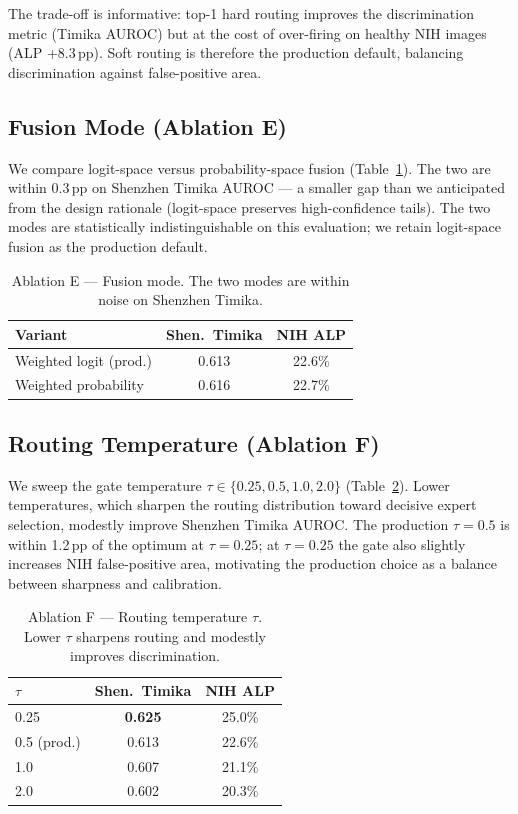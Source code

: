 \documentclass{article}
\begin{document}
The trade-off is informative: top-1 hard routing improves the discrimination metric (Timika AUROC) but at the cost of over-firing on healthy NIH images (ALP +8.3\,pp). Soft routing is therefore the production default, balancing discrimination against false-positive area.

\subsection{Fusion Mode (Ablation E)}
\label{sec:abl_E}

We compare logit-space versus probability-space fusion (Table~\ref{tab:abl_fusion}). The two are within 0.3\,pp on Shenzhen Timika AUROC --- a smaller gap than we anticipated from the design rationale (logit-space preserves high-confidence tails). The two modes are statistically indistinguishable on this evaluation; we retain logit-space fusion as the production default.

\begin{table}[t]
\caption{Ablation E --- Fusion mode. The two modes are within noise on Shenzhen Timika.}
\label{tab:abl_E}
\label{tab:abl_fusion}
\vskip 0.1in
\centering
\small
\begin{tabular}{lcc}
\toprule
Variant & Shen.\ Timika & NIH ALP \\
\midrule
Weighted logit (prod.) & 0.613 & 22.6\% \\
Weighted probability & 0.616 & 22.7\% \\
\bottomrule
\end{tabular}
\end{table}

\subsection{Routing Temperature (Ablation F)}
\label{sec:abl_F}

We sweep the gate temperature $\tau \in \{0.25, 0.5, 1.0, 2.0\}$ (Table~\ref{tab:abl_F}). Lower temperatures, which sharpen the routing distribution toward decisive expert selection, modestly improve Shenzhen Timika AUROC. The production $\tau = 0.5$ is within 1.2\,pp of the optimum at $\tau = 0.25$; at $\tau = 0.25$ the gate also slightly increases NIH false-positive area, motivating the production choice as a balance between sharpness and calibration.

\begin{table}[t]
\caption{Ablation F --- Routing temperature $\tau$. Lower $\tau$ sharpens routing and modestly improves discrimination.}
\label{tab:abl_F}
\vskip 0.1in
\centering
\small
\begin{tabular}{lcc}
\toprule
$\tau$ & Shen.\ Timika & NIH ALP \\
\midrule
0.25 & \textbf{0.625} & 25.0\% \\
0.5 (prod.) & 0.613 & 22.6\% \\
1.0 & 0.607 & 21.1\% \\
2.0 & 0.602 & 20.3\% \\
\bottomrule
\end{tabular}
\end{table}
\end{document}
